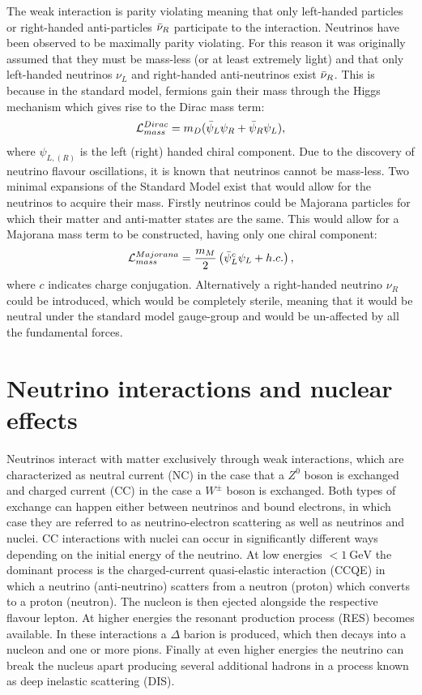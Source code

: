 The weak interaction is parity violating meaning that only left-handed particles or right-handed anti-particles $\Bar{\nu}_R$ participate to the interaction. Neutrinos have been observed to be maximally parity violating. For this reason it was originally assumed that they must be mass-less (or at least extremely light) and that only left-handed neutrinos $\nu_L$ and right-handed anti-neutrinos exist $\Bar{\nu}_R$. This is because in the standard model, fermions gain their mass through the Higgs mechanism which gives rise to the Dirac mass term:
\begin{equation}
    \mathcal{L}^{Dirac}_{mass}=m_{D}(\Bar{\psi}_L\psi_R+\Bar{\psi}_R\psi_L) ,
\end{equation}
where $\psi_{L,(R)}$ is the left (right) handed chiral component. Due to the discovery of neutrino flavour oscillations, it is known that neutrinos cannot be mass-less. Two minimal expansions of the Standard Model exist that would allow for the neutrinos to acquire their mass. Firstly neutrinos could be Majorana particles for which their matter and anti-matter states are the same. This would allow for a Majorana mass term to be constructed, having only one chiral component:
\begin{equation}
    \mathcal{L}^{Majorana}_{mass}=\frac{m_M}{2}\left(\Bar{\psi}_L^c\psi_L+h.c.\right) ,
\end{equation}
where $c$ indicates charge conjugation. Alternatively a right-handed neutrino $\nu_R$ could be introduced, which would be completely sterile, meaning that it would be neutral under the standard model gauge-group and would be un-affected by all the fundamental forces.



\section{Neutrino interactions and nuclear effects}
\label{Sec:NeutrinoInteractions}
Neutrinos interact with matter exclusively through weak interactions, which are characterized as neutral current (NC) in the case that a $Z^0$ boson is exchanged and charged current (CC) in the case a $W^\pm$ boson is exchanged. Both types of exchange can happen either between neutrinos and bound electrons, in which case they are referred to as neutrino-electron scattering as well as neutrinos and nuclei. CC interactions with nuclei can occur in significantly different ways depending on the initial energy of the neutrino. At low energies $<1\ \text{GeV}$ the dominant process is the charged-current quasi-elastic interaction (CCQE) in which a neutrino (anti-neutrino) scatters from a neutron (proton) which converts to a proton (neutron). The nucleon is then ejected alongside the respective flavour lepton. At higher energies the resonant production process (RES) becomes available. In these interactions a $\Delta$ barion is produced, which then decays into a nucleon and one or more pions. Finally at even higher energies the neutrino can break the nucleus apart producing several additional hadrons in a process known as deep inelastic scattering (DIS). 

